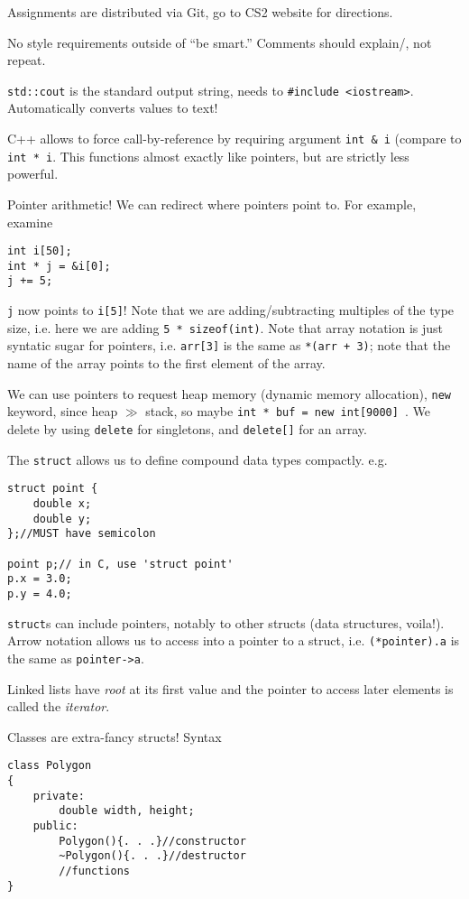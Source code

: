\documentclass[10pt, twocolumn]{article}
\begin{document}
Assignments are distributed via Git, go to CS2 website for directions.

No style requirements outside of ``be smart.'' Comments should explain/, not repeat.

\texttt{std::cout} is the standard output string, needs to \texttt{\#include <iostream>}. Automatically converts values to text!

C++ allows to force call-by-reference by requiring argument \texttt{int \& i} (compare to \texttt{int * i}. This functions almost exactly like pointers, but are strictly less powerful.

Pointer arithmetic! We can redirect where pointers point to. For example, examine
\begin{verbatim}
int i[50];
int * j = &i[0];
j += 5;
\end{verbatim}

\texttt{j} now points to \texttt{i[5]}! Note that we are adding/subtracting multiples of the type size, i.e. here we are adding \texttt{5 * sizeof(int)}. Note that array notation is just syntatic sugar for pointers, i.e. \texttt{arr[3]} is the same as \texttt{*(arr + 3)}; note that the name of the array points to the first element of the array. 

We can use pointers to request heap memory (dynamic memory allocation), \texttt{new} keyword, since heap $\gg$ stack, so maybe \texttt{int * buf = new int[9000] }. We delete by using \texttt{delete} for singletons, and \texttt{delete[]} for an array. 

The \texttt{struct} allows us to define compound data types compactly. e.g.
\begin{verbatim}
struct point {
    double x;
    double y;
};//MUST have semicolon

point p;// in C, use 'struct point'
p.x = 3.0;
p.y = 4.0;
\end{verbatim}

\texttt{struct}s can include pointers, notably to other structs (data structures, voila!). Arrow notation allows us to access into a pointer to a struct, i.e. \texttt{(*pointer).a} is the same as \texttt{pointer->a}. 

Linked lists have \emph{root} at its first value and the pointer to access later elements is called the \emph{iterator}.

Classes are extra-fancy structs! Syntax
\begin{verbatim}
class Polygon
{
    private:
        double width, height;
    public:
        Polygon(){. . .}//constructor
        ~Polygon(){. . .}//destructor
        //functions
}
\end{verbatim}
\end{document}
